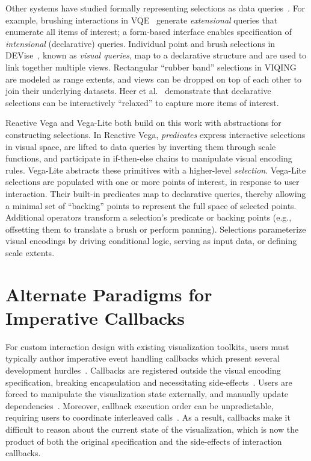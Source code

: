 Other systems have studied formally representing selections as data
queries~\cite{wilhelm:interaction}. For example, brushing interactions in
VQE~\cite{derthick:interactive} generate \emph{extensional} queries that
enumerate all items of interest; a form-based interface enables specification of
\emph{intensional} (declarative) queries. Individual point and brush selections
in DEVise~\cite{livny:devise}, known as \emph{visual queries}, map to a
declarative structure and are used to link together multiple views. Rectangular
``rubber band'' selections in VIQING~\cite{olsten:viqing} are modeled as range
extents, and views can be dropped on top of each other to join their underlying
datasets. Heer et al.~\cite{heer:generalized} demonstrate that declarative
selections can be interactively ``relaxed'' to capture more items of interest.

Reactive Vega and Vega-Lite both build on this work with abstractions for
constructing selections. In Reactive Vega, \emph{predicates} express interactive
selections in visual space, are lifted to data queries by inverting them through
scale functions, and participate in if-then-else chains to manipulate visual
encoding rules. Vega-Lite abstracts these primitives with a higher-level
\emph{selection}. Vega-Lite selections are populated with one or more points of
interest, in response to user interaction. Their built-in predicates map to
declarative queries, thereby allowing a minimal set of ``backing'' points to
represent the full space of selected points. Additional operators transform a
selection's predicate or backing points (e.g., offsetting them to translate a
brush or perform panning). Selections parameterize visual encodings by driving
conditional logic, serving as input data, or defining scale extents.

\vspace{-20pt}

\section{Alternate Paradigms for Imperative Callbacks}

\vspace{-10pt}

For custom interaction design with existing visualization toolkits, users must
typically author imperative event handling callbacks which present several
development hurdles~\cite{myers:callbacks}. Callbacks are registered outside the
visual encoding specification, breaking encapsulation and necessitating
side-effects~\cite{cooper:integrating}. Users are forced to manipulate the
visualization state externally, and manually update
dependencies~\cite{cooper:embedding}. Moreover, callback execution order can be
unpredictable, requiring users to coordinate interleaved
calls~\cite{edwards:coherent}. As a result, callbacks make it difficult to
reason about the current state of the visualization, which is now the product of
both the original specification and the side-effects of interaction callbacks.

